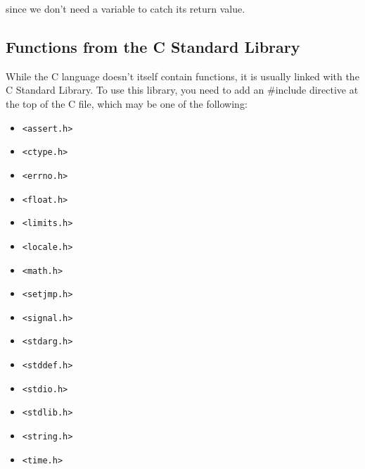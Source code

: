 since we don't need a variable to catch its return value.

\subsection{Functions from the C Standard Library}
While the C language doesn't itself contain functions, it is usually linked
with the C Standard Library. To use this library, you need to add an \#include
directive at the top of the C file, which may be one of the following:
\begin{itemize}
\setlength{\itemsep}{0cm}
\setlength{\parskip}{0cm}
\item \texttt{\textless{}assert.h\textgreater{}}
\item \texttt{\textless{}ctype.h\textgreater{}}
\item \texttt{\textless{}errno.h\textgreater{}}
\item \texttt{\textless{}float.h\textgreater{}}
\end{itemize}
\begin{itemize}
\setlength{\itemsep}{0cm}
\setlength{\parskip}{0cm}
\item \texttt{\textless{}limits.h\textgreater{}}
\item \texttt{\textless{}locale.h\textgreater{}}
\item \texttt{\textless{}math.h\textgreater{}}
\item \texttt{\textless{}setjmp.h\textgreater{}}
\end{itemize}
\begin{itemize}
\setlength{\itemsep}{0cm}
\setlength{\parskip}{0cm}
\item \texttt{\textless{}signal.h\textgreater{}}
\item \texttt{\textless{}stdarg.h\textgreater{}}
\item \texttt{\textless{}stddef.h\textgreater{}}
\item \texttt{\textless{}stdio.h\textgreater{}}
\end{itemize}
\begin{itemize}
\setlength{\itemsep}{0cm}
\setlength{\parskip}{0cm}
\item \texttt{\textless{}stdlib.h\textgreater{}}
\item \texttt{\textless{}string.h\textgreater{}}
\item \texttt{\textless{}time.h\textgreater{}}
\end{itemize}

